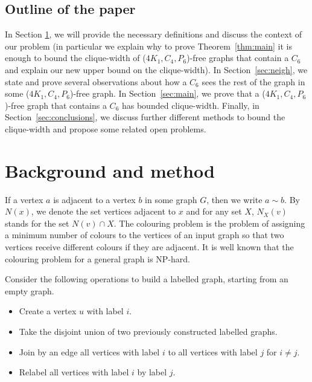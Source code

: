 \documentclass[12pt]{article}
\begin{document}
	\subsection*{Outline of the paper}
	
	In Section \ref{sec:intro}, we will provide the necessary definitions and discuss the context of our problem (in particular we explain why to prove Theorem~\ref{thm:main} it is enough to bound the clique-width of ($4K_1, C_4, P_6$)-free graphs that contain a $C_6$ and explain our new upper bound on the clique-width). 
	In Section~\ref{sec:neigh}, we state and prove several observations about how a $C_6$ sees the rest of the graph in some ($4K_1, C_4, P_6$)-free graph. 
	In Section~\ref{sec:main}, we prove that a ($4K_1, C_4, P_6$)-free graph that contains a $C_6$ has bounded clique-width. 
	Finally, in Section~\ref{sec:conclusions}, we discuss further different methods to bound the clique-width and propose some related open problems. 
	
	\section{Background and method}\label{sec:intro}
	
	If a vertex $a$ is adjacent to a vertex $b$ in some graph $G$, then we write $a \sim b$. By $N(x)$, we denote the set vertices adjacent to $x$ and for any set $X$, $N_X(v)$ stands for the set $N(v) \cap X$. 
	The colouring problem is the problem of assigning a minimum number of colours to the vertices of an input graph so that two vertices receive different colours if they are adjacent. 
	It is well known that the colouring problem for a general graph is NP-hard. 
	
	Consider the following operations to build a labelled graph, starting from an empty graph.
	
	\begin{itemize}
		
		\item Create a vertex $u$ with label $i$. 
		
		\item  Take the disjoint union of two previously constructed labelled graphs.
		
		\item Join by an edge all vertices with label $i$ to all
		vertices with label $j$ for $i \not= j$.
		
		\item  Relabel all vertices with label $i$ by label $j$.
	\end{itemize}
	
\end{document}
